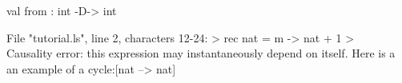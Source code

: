 \runverbatimfalse
{}
\begin{RunVerbatimMsg}
val from : int -D-> int
\end{RunVerbatimMsg}
\begin{RunVerbatimErr}
File "tutorial.ls", line 2, characters 12-24:
>  rec nat = m -> nat + 1
>            ^^^^^^^^^^^^
Causality error: this expression may instantaneously depend on itself.
Here is a an example of a cycle:[nat --> nat]
\end{RunVerbatimErr}
